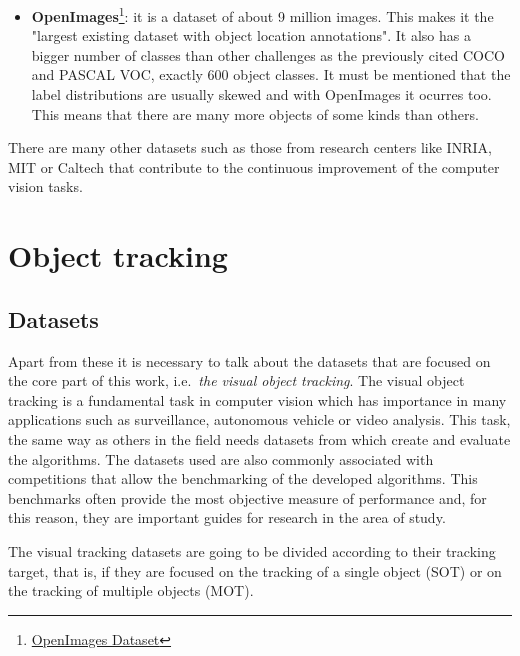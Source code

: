 \begin{itemize}
\item \textbf{OpenImages}\footnote {\href{https://storage.googleapis.com/openimages/web/index.html}{OpenImages Dataset}}: it is a dataset of about 9 million images. This makes it the "largest existing dataset with object location annotations". It also has a bigger number of classes than other challenges as the previously cited COCO and PASCAL VOC, exactly 600 object classes. It must be mentioned that the label distributions are usually skewed and with OpenImages it ocurres too. This means that there are many more objects of some kinds than others.
\end{itemize}
There are many other datasets such as those from research centers like INRIA, MIT or Caltech that contribute to the continuous improvement of the computer vision tasks.
\section{Object tracking}
\subsection{Datasets}
Apart from these it is necessary to talk about the datasets that are focused on the core part of this work, i.e.\ \textit{the visual object tracking}. The visual object tracking is a fundamental task in computer vision which has importance in many applications such as surveillance, autonomous vehicle or video analysis. This task, the same way as others in the field needs datasets from which create and evaluate the algorithms. The datasets used are also commonly associated with competitions that allow the benchmarking of the developed algorithms. This benchmarks often provide the most objective measure of performance and, for this reason, they are important guides for research in the area of study.

The visual tracking datasets are going to be divided according to their tracking target, that is, if they are focused on the tracking of a single object (SOT) or on the tracking of multiple objects (MOT).
